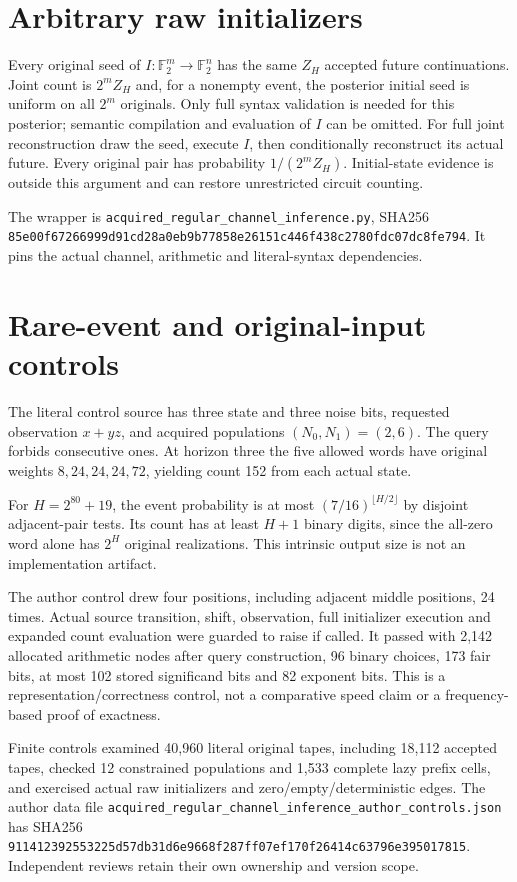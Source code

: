 \documentclass[11pt]{article}
\newcommand{\F}{\mathbb F_2}
\begin{document}
\section{Arbitrary raw initializers}
Every original seed of $I:\F^m\to\F^n$ has the same $Z_H$ accepted future
continuations. Joint count is $2^mZ_H$ and, for a nonempty event, the posterior
initial seed is uniform on all $2^m$ originals. Only full syntax validation
is needed for this posterior; semantic compilation and evaluation of $I$
can be omitted. For full joint reconstruction draw the seed, execute $I$,
then conditionally reconstruct its actual future. Every original pair has
probability $1/(2^mZ_H)$. Initial-state evidence is outside this argument
and can restore unrestricted circuit counting.

The wrapper is \nolinkurl{acquired_regular_channel_inference.py}, SHA256
\nolinkurl{85e00f67266999d91cd28a0eb9b77858e26151c446f438c2780fdc07dc8fe794}.
It pins the actual channel, arithmetic and literal-syntax dependencies.

\section{Rare-event and original-input controls}
The literal control source has three state and three noise bits, requested
observation $x+yz$, and acquired populations $(N_0,N_1)=(2,6)$. The query
forbids consecutive ones. At horizon three the five allowed words have
original weights $8,24,24,24,72$, yielding count 152 from each actual state.

For $H=2^{80}+19$, the event probability is at most
$(7/16)^{\lfloor H/2\rfloor}$ by disjoint adjacent-pair tests. Its count has
at least $H+1$ binary digits, since the all-zero word alone has $2^H$ original
realizations. This intrinsic output size is not an implementation artifact.

The author control drew four positions, including adjacent middle positions,
24 times. Actual source transition, shift, observation, full initializer
execution and expanded count evaluation were guarded to raise if called.
It passed with 2,142 allocated arithmetic nodes after query construction,
96 binary choices, 173 fair bits, at most 102 stored significand bits and
82 exponent bits. This is a representation/correctness control, not a
comparative speed claim or a frequency-based proof of exactness.

Finite controls examined 40,960 literal original tapes, including 18,112
accepted tapes, checked 12 constrained populations and 1,533 complete lazy
prefix cells, and exercised actual raw initializers and zero/empty/deterministic
edges. The author data file
\nolinkurl{acquired_regular_channel_inference_author_controls.json} has SHA256
\nolinkurl{911412392553225d57db31d6e9668f287ff07ef170f26414c63796e395017815}.
Independent reviews retain their own ownership and version scope.
\end{document}
